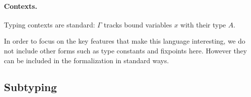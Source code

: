 \paragraph{Contexts.} Typing contexts are standard: $ \Gamma $ tracks bound variables $x$ with their type $A$.


In order to focus on the key features that make this language interesting, we do
not include other forms such as type constants and fixpoints here. However they
can be included in the formalization in standard ways. 


\subsection{Subtyping}


